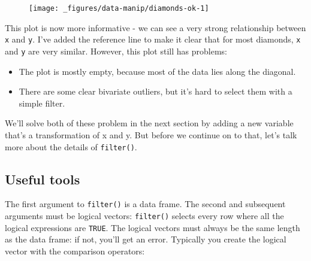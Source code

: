 \begin{Shaded}
\begin{Highlighting}[]
\StringTok{ }\StringTok{ }\StringTok{ }\StringTok{ }\NormalTok{)}
\StringTok{  }\NormalTok{() +}
\StringTok{  }\NormalTok{(} \NormalTok{, } \NormalTok{, } \NormalTok{, } \NormalTok{)}
\end{Highlighting}
\end{Shaded}

\begin{figure}[H]
  \centering
  \texttt{[image: \_figures/data-manip/diamonds-ok-1]}
\end{figure}

This plot is now more informative - we can see a very strong
relationship between \texttt{x} and \texttt{y}. I've added the reference
line to make it clear that for most diamonds, \texttt{x} and \texttt{y}
are very similar. However, this plot still has problems:

\begin{itemize}
\item
  The plot is mostly empty, because most of the data lies along the
  diagonal.
\item
  There are some clear bivariate outliers, but it's hard to select them
  with a simple filter.
\end{itemize}

We'll solve both of these problem in the next section by adding a new
variable that's a transformation of x and y. But before we continue on
to that, let's talk more about the details of \texttt{filter()}.

\subsection{Useful tools}\label{useful-tools}

The first argument to \texttt{filter()} is a data frame. The second and
subsequent arguments must be logical vectors: \texttt{filter()} selects
every row where all the logical expressions are \texttt{TRUE}. The
logical vectors must always be the same length as the data frame: if
not, you'll get an error. Typically you create the logical vector with
the comparison operators:

